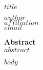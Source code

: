 \documentclass[$fontsize$, a4paper]{article}
\begin{document}







{\LARGE\textbf{$title$}}
\begin{center}
  \textsc{$author$}\\
  $affiliation$\\
  $email$
\end{center}

\textbf{Abstract}\\
$abstract$

\vspace{3em}

$body$
\end{document}
